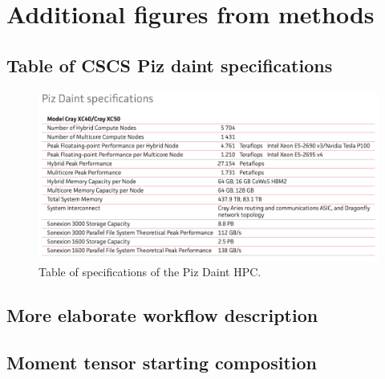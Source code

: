 \documentclass[../Text/00main.tex]{subfiles}
\begin{document}
\chapter{Additional figures from methods}

\section{Table of CSCS Piz daint specifications}\label{app:pizdaint}

\begin{figure}[htb!]
    \centering
    \includegraphics[width=.98\linewidth]{images_methods/Pizdainttable.png}
    \caption{Table of specifications of the Piz Daint HPC. }
    \label{fig:my_label}
\end{figure}
\FloatBarrier
\section{More elaborate workflow description}\label{app:software}

\section{Moment tensor starting composition}\label{app:sdrvar_methods}
\end{document}
